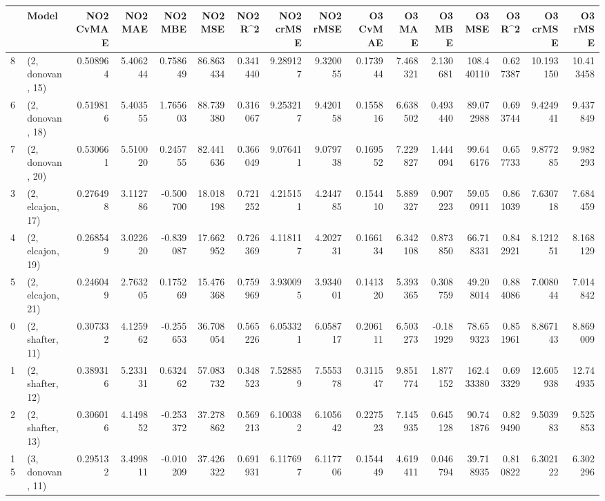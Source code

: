 \begin{tabular}{llrrrrrrrrrrrrrr}
\toprule
{} &             Model &  NO2 CvMAE &   NO2 MAE &   NO2 MBE &    NO2 MSE &   NO2 R\textasciicircum2 &  NO2 crMSE &  NO2 rMSE &  O3 CvMAE &    O3 MAE &    O3 MBE &      O3 MSE &    O3 R\textasciicircum2 &   O3 crMSE &    O3 rMSE \\
\midrule
8  &  (2, donovan, 15) &   0.508964 &  5.406244 &  0.758649 &  86.863434 &  0.341440 &   9.289127 &  9.320055 &  0.173944 &  7.468321 &  2.130681 &  108.440110 &  0.627387 &  10.193150 &  10.413458 \\
6  &  (2, donovan, 18) &   0.519816 &  5.403555 &  1.765603 &  88.739380 &  0.316067 &   9.253217 &  9.420158 &  0.155816 &  6.638502 &  0.493440 &   89.072988 &  0.693744 &   9.424941 &   9.437849 \\
7  &  (2, donovan, 20) &   0.530661 &  5.510020 &  0.245755 &  82.441636 &  0.366049 &   9.076411 &  9.079738 &  0.169552 &  7.229827 &  1.444094 &   99.646176 &  0.657733 &   9.877285 &   9.982293 \\
3  &  (2, elcajon, 17) &   0.276498 &  3.112786 & -0.500700 &  18.018198 &  0.721252 &   4.215151 &  4.244785 &  0.154410 &  5.889327 &  0.907223 &   59.050911 &  0.861039 &   7.630718 &   7.684459 \\
4  &  (2, elcajon, 19) &   0.268549 &  3.022620 & -0.839087 &  17.662952 &  0.726369 &   4.118117 &  4.202731 &  0.166134 &  6.342108 &  0.873850 &   66.718331 &  0.842921 &   8.121251 &   8.168129 \\
5  &  (2, elcajon, 21) &   0.246049 &  2.763205 &  0.175269 &  15.476368 &  0.759969 &   3.930095 &  3.934001 &  0.141320 &  5.393365 &  0.308759 &   49.208014 &  0.884086 &   7.008044 &   7.014842 \\
0  &  (2, shafter, 11) &   0.307332 &  4.125962 & -0.255653 &  36.708054 &  0.565226 &   6.053321 &  6.058717 &  0.206111 &  6.503273 & -0.181929 &   78.659323 &  0.851961 &   8.867143 &   8.869009 \\
1  &  (2, shafter, 12) &   0.389316 &  5.233131 &  0.632462 &  57.083732 &  0.348523 &   7.528859 &  7.555378 &  0.311547 &  9.851774 &  1.877152 &  162.433380 &  0.693329 &  12.605938 &  12.744935 \\
2  &  (2, shafter, 13) &   0.306016 &  4.149852 & -0.253372 &  37.278862 &  0.569213 &   6.100382 &  6.105642 &  0.227523 &  7.145935 &  0.645128 &   90.741876 &  0.829490 &   9.503983 &   9.525853 \\
15 &  (3, donovan, 11) &   0.295132 &  3.499811 & -0.010209 &  37.426322 &  0.691931 &   6.117697 &  6.117706 &  0.154449 &  4.619411 &  0.046794 &   39.718935 &  0.810822 &   6.302122 &   6.302296 \\

\end{tabular}
